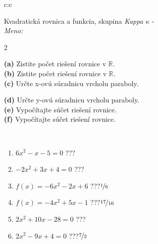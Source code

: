 \documentclass[10pt]{report}
\begin{document}
\begin{tabular}{c:c}
\begin{minipage}[c][104.5mm][t]{0.5\linewidth}
\begin{center}
\vspace{7mm}
{\huge {\LARGE Kvadratická rovnica a funkcia}, skupina \textit{Kappa $\kappa$} -}\\[5mm]
\textit{Meno:}\phantom{xxxxxxxxxxxxxxxxxxxxxxxxxxxxxxxxxxxxxxxxxxxxxxxxxxxxxxxxxxxxxxxxx}\\[5mm]
\begin{minipage}{0.95\linewidth}
\begin{center}
{\small \begin{multicols}{2} \raggedright
\textbf{(a)} Zistite počet riešení rovnice v \(\mathbb{R}\). \\[1mm]
\textbf{(b)} Zistite počet riešení rovnice v \(\mathbb{R}\). \\[1mm]
\textbf{(c)} Určte x-ovú súradnicu vrcholu paraboly. \par \columnbreak
\textbf{(d)} Určte y-ovú súradnicu vrcholu paraboly. \\[1mm]
\textbf{(e)} Vypočítajte súčet riešení rovnice. \\[1mm]
\textbf{(f)} Vypočítajte súčet riešení rovnice.
\end{multicols}
}
\end{center}
\end{minipage}
\\[4mm]
\begin{minipage}{0.79\linewidth}
\begin{center}
\begin{varwidth}{\linewidth}
\begin{enumerate}
\Large
\item $6x^2-x-5=0$\quad \dotfill\; ???\;\dotfill {}
\item $-2x^2+3x+4=0$\quad \dotfill\; ???\;\dotfill {}
\item $f(x)=-6x^2-2x+6$\quad \dotfill\; ???\;\dotfill \quad $\nicefrac{1}{6}$
\item $f(x)=-4x^2+5x-1$\quad \dotfill\; ???\;\dotfill \quad $\nicefrac{17}{16}$
\item $2x^2+10x-28=0$\quad \dotfill\; ???\;\dotfill {}
\item $2x^2-9x+4=0$\quad \dotfill\; ???\;\dotfill \quad $\nicefrac{7}{2}$
\end{enumerate}
\end{varwidth}
\end{center}

\end{minipage}
\end{center}
\end{minipage}
\end{tabular}
\end{document}
